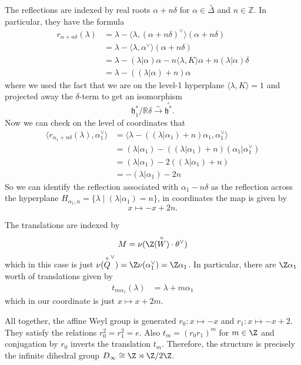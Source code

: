 \documentclass[12pt]{article}
\begin{document}
\begin{example}
    The reflections are indexed by real roots $\alpha + n\delta$ for $\alpha \in \overset{\circ}{\Delta}$ and $n \in \mathbb{Z}$. In particular, they have the formula \begin{align*}
        r_{\alpha + n\delta}(\lambda) & = \lambda - \langle \lambda, (\alpha + n\delta)^\vee \rangle (\alpha + n\delta)                  \\
                                      & = \lambda - \langle \lambda, \alpha^\vee \rangle (\alpha + n\delta)                              \\
                                      & = \lambda - (\lambda|\alpha)\alpha - n\langle \lambda, K\rangle \alpha + n(\lambda|\alpha)\delta \\
                                      & = \lambda - ((\lambda|\alpha) + n)\alpha
    \end{align*} where we used the fact that we are on the level-1 hyperplane $\langle \lambda, K \rangle = 1$ and projected away the $\delta$-term to get an isomorphism \[\mathfrak{h}^*_1/\mathbb{R}\delta \xrightarrow{\sim} \overset{\circ}{\mathfrak{h}^*}.\] Now we can check on the level of coordinates that \begin{align*}
        \langle r_{\alpha_1 + n\delta}(\lambda), \alpha_1^\vee \rangle & = \langle \lambda - ((\lambda|\alpha_1) + n)\alpha_1, \alpha_1^\vee \rangle \\
                                                                       & = (\lambda|\alpha_1) - ((\lambda|\alpha_1) + n)(\alpha_1|\alpha_1^\vee)     \\
                                                                       & = (\lambda|\alpha_1) - 2((\lambda|\alpha_1) + n)                            \\
                                                                       & = -(\lambda|\alpha_1) - 2n
    \end{align*}
    So we can identify the reflection associated with $\alpha_1 - n\delta$ as the reflection across the hyperplane $H_{\alpha_1,n} = \{\lambda \mid (\lambda|\alpha_1) = n\}$, in coordinates the map is given by \[x \mapsto -x + 2n.\]

    The translations are indexed by \[M = \nu(\Z(\overset{\circ}{W})\cdot \theta^\vee)\] which in this case is just $\nu(\overset{\circ}{Q}^\vee) = \Z \nu(\alpha_1^\vee) = \Z \alpha_1$. In particular, there are $\Z\alpha_1$ worth of translations given by \begin{align*}
        t_{m\alpha_1}(\lambda) & = \lambda + m\alpha_1
    \end{align*} which in our coordinate is just $x \mapsto x + 2m$.

    All together, the affine Weyl group is generated $r_0:x \mapsto -x$ and $r_1:x \mapsto -x + 2$. They satisfy the relations $r_0^2 = r_1^2 = e$. Also $t_m = (r_0 r_1)^m$ for $m \in \Z$ and conjugation by $r_0$ inverts the translation $t_m$. Therefore, the structure is precisely the infinite dihedral group $D_\infty \cong \Z \rtimes \Z/2\Z$.
\end{example}
\end{document}

